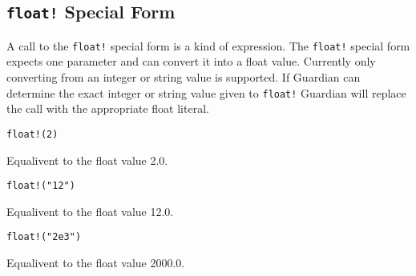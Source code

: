 
\subsection{\texttt{float!} Special Form}
{
	A call to the \texttt{float!} special form is a kind of expression.
	The \texttt{float!} special form expects one parameter and can convert it
	into a float value. Currently only converting from an integer or string
	value is supported.
	If Guardian can determine the exact integer or string value given to
	\texttt{float!} Guardian will replace the call with the appropriate
	float literal.
	
	\begin{itemize}
	{
		\item \texttt{float!(2)}
		
			Equalivent to the float value 2.0.
		
		\item \texttt{float!("12")}
		
			Equalivent to the float value 12.0.
		
		\item \texttt{float!("2e3")}
		
			Equalivent to the float value 2000.0.
	}
	\end{itemize}
}
